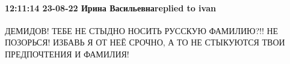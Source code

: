  
 
 
 
 

\paragraph{12:11:14 23-08-22 Ирина Васильевнаreplied to ivan}

ДЕМИДОВ! ТЕБЕ НЕ СТЫДНО НОСИТЬ РУССКУЮ ФАМИЛИЮ?!! НЕ ПОЗОРЬСЯ! ИЗБАВЬ Я ОТ НЕЁ
СРОЧНО, А ТО НЕ СТЫКУЮТСЯ ТВОИ ПРЕДПОЧТЕНИЯ И ФАМИЛИЯ!

